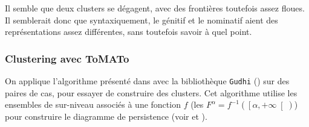\documentclass{cours}
\begin{document}
Il semble que deux clusters se dégagent, avec des frontières toutefois assez floues.
Il semblerait donc que syntaxiquement, le génitif et le nominatif aient des représentations assez différentes, sans toutefois savoir à quel point.

\subsubsection{Clustering avec ToMATo}\label{subsub:tomato}
On applique l'algorithme présenté dans \cite{ToMATo} avec la bibliothèque \texttt{Gudhi} (\cite{Gudhi}) sur des paires de cas, pour essayer de construire des clusters.
Cet algorithme utilise les ensembles de sur-niveau associés à une fonction $f$ (les $F^{\alpha} = f^{-1}\left(\left[\alpha, +\infty\right[\right)$) pour construire le diagramme de persistence (voir \cite{tldrtda} et \cite{ToMATo}).
\end{document}
